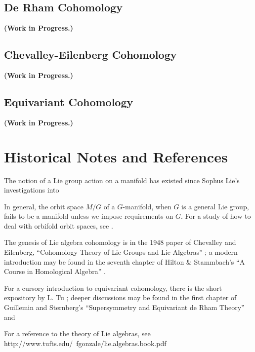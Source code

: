 \documentclass{tufte-handout}
\begin{document}
\subsection{De Rham Cohomology}
\textbf{(Work in Progress.)}

\subsection{Chevalley-Eilenberg Cohomology}
\textbf{(Work in Progress.)}

\subsection{Equivariant Cohomology}
\textbf{(Work in Progress.)}

\section{Historical Notes and References}
The notion of a Lie group action on a manifold has existed since Sophus Lie's investigations into %

In general, the orbit space $M / G$ of a $G$-manifold, when $G$ is a general Lie group, fails to be a manifold unless we impose requirements on $G$. For a study of how to deal with orbifold orbit spaces, see \cite{FIGURE SOMETHING OUT LOOK IT UP}.

The genesis of Lie algebra cohomology is in the 1948 paper of Chevalley and Eilenberg, ``Cohomology Theory of Lie Groups and Lie Algebras'' \cite{chevalleyeilenberg}; a modern introduction may be found in the seventh chapter of Hilton \& Stammbach's ``A Course in Homological Algebra'' \cite{HiltonStammbach}.

For a cursory introduction to equivariant cohomology, there is the short expository by L. Tu \cite{tuequivariant};
deeper discussions may be found in the first chapter of Guillemin and Sternberg's ``Supersymmetry and Equivariant de Rham Theory''
and %

For a reference to the theory of Lie algebras, see
http://www.tufts.edu/~fgonzale/lie.algebras.book.pdf
\end{document}
